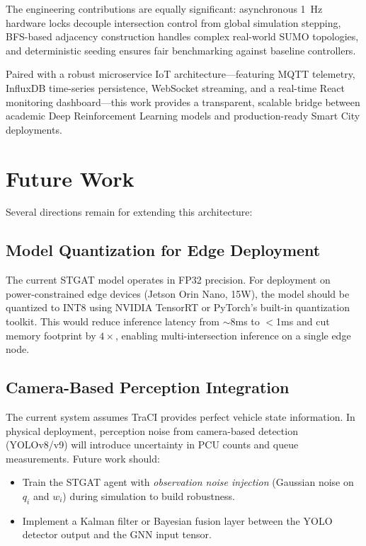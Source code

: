 \documentclass[12pt, onecolumn]{IEEEtran}
\begin{document}
The engineering contributions are equally significant: asynchronous 1~Hz hardware locks decouple intersection control from global simulation stepping, BFS-based adjacency construction handles complex real-world SUMO topologies, and deterministic seeding ensures fair benchmarking against baseline controllers.

Paired with a robust microservice IoT architecture---featuring MQTT telemetry, InfluxDB time-series persistence, WebSocket streaming, and a real-time React monitoring dashboard---this work provides a transparent, scalable bridge between academic Deep Reinforcement Learning models and production-ready Smart City deployments.

\section{Future Work}
Several directions remain for extending this architecture:

\subsection{Model Quantization for Edge Deployment}
The current STGAT model operates in FP32 precision. For deployment on power-constrained edge devices (Jetson Orin Nano, 15W), the model should be quantized to INT8 using NVIDIA TensorRT or PyTorch's built-in quantization toolkit. This would reduce inference latency from $\sim$8ms to $<$1ms and cut memory footprint by $4\times$, enabling multi-intersection inference on a single edge node.

\subsection{Camera-Based Perception Integration}
The current system assumes TraCI provides perfect vehicle state information. In physical deployment, perception noise from camera-based detection (YOLOv8/v9) will introduce uncertainty in PCU counts and queue measurements. Future work should:
\begin{itemize}
    \item Train the STGAT agent with \textit{observation noise injection} (Gaussian noise on $q_i$ and $w_i$) during simulation to build robustness.
    \item Implement a Kalman filter or Bayesian fusion layer between the YOLO detector output and the GNN input tensor.
\end{itemize}
\end{document}
